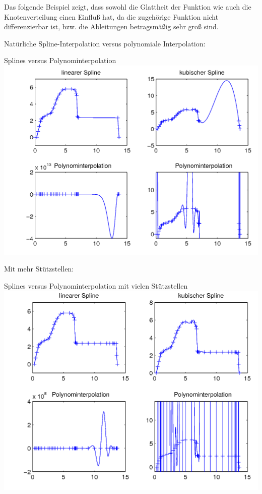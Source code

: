                 \begin{Bspe}[Laster]\label{5.2.20}
                  Das folgende Beispiel zeigt,
                  dass sowohl die Glattheit der Funktion
                  wie auch die Knotenverteilung einen Einfluß hat,
                  da die zugehörige Funktion nicht differenzierbar ist,
                  bzw. die Ableitungen betragsmäßig sehr groß sind.

                  Natürliche Spline-Interpolation
                  versus polynomiale Interpolation:\\
                  \begin{image}{Splines versus Polynominterpolation}
                    \includegraphics[width=\linewidth]{images/laster1.png}
                  \end{image}\label{6.2.19(1)}

                  Mit mehr Stützstellen:\\
                  \begin{image}{Splines versus Polynominterpolation
                      mit vielen Stützstellen}
                    \includegraphics[width=\linewidth]{images/laster2.png} 
                  \end{image}\label{6.2.19(2)}
                \end{Bspe}

